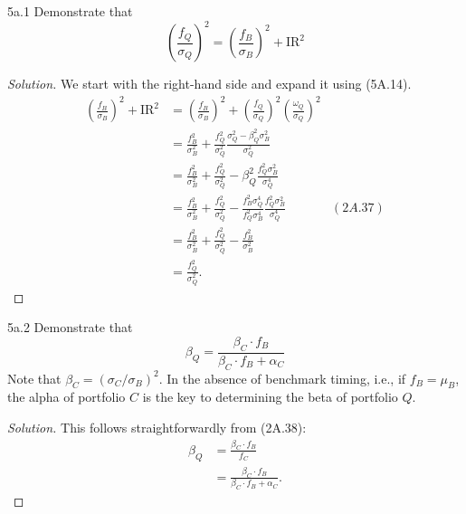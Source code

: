 
\begin{problem}{5a.1}
Demonstrate that \[\left( \frac{f_{Q}}{\sigma_{Q}} \right)^{2} = \left( \frac{f_{B}}{\sigma_{B}} \right)^{2} + \mathrm{IR}^{2}\]
\end{problem}

\begin{proof}[Solution]
We start with the right-hand side and expand it using (5A.14).
\begin{align*}
\left( \frac{f_{B}}{\sigma_{B}} \right)^{2} + \mathrm{IR}^{2} &= \left( \frac{f_{B}}{\sigma_{B}} \right)^{2} + \left( \frac{f_{Q}}{\sigma_{Q}} \right)^{2} \left( \frac{\omega_{Q}}{\sigma_{Q}} \right)^{2}\\
&= \frac{f_{B}^{2}}{\sigma_{B}^{2}} + \frac{f_{Q}^{2}}{\sigma_{Q}^{2}}\frac{\sigma_{Q}^{2} - \beta_{Q}^{2}\sigma_{B}^{2}}{\sigma_{Q}^{2}}\\
&= \frac{f_{B}^{2}}{\sigma_{B}^{2}} + \frac{f_{Q}^{2}}{\sigma_{Q}^{2}} - \beta_{Q}^{2}\frac{f_{Q}^{2}\sigma_{B}^{2}}{\sigma_{Q}^{4}}\\
&= \frac{f_{B}^{2}}{\sigma_{B}^{2}} + \frac{f_{Q}^{2}}{\sigma_{Q}^{2}} - \frac{f_{B}^{2}\sigma_{Q}^{4}}{f_{Q}^{2}\sigma_{B}^{4}}\frac{f_{Q}^{2}\sigma_{B}^{2}}{\sigma_{Q}^{4}} &(2A.37)\\
&= \frac{f_{B}^{2}}{\sigma_{B}^{2}} + \frac{f_{Q}^{2}}{\sigma_{Q}^{2}} - \frac{f_{B}^{2}}{\sigma_{B}^{2}}\\
&= \frac{f_{Q}^{2}}{\sigma_{Q}^{2}}.
\end{align*}
\end{proof}


\begin{problem}{5a.2}
Demonstrate that \[\beta_{Q} = \frac{\beta_{C} \cdot f_{B}}{\beta_{C} \cdot f_{B} + \alpha_{C}}\] Note that $\beta_{C} = (\sigma_{C}/\sigma_{B})^{2}$. In the absence of benchmark timing, i.e., if $f_{B} = \mu_{B}$, the alpha of portfolio $C$ is the key to determining the beta of portfolio $Q$.
\end{problem}

\begin{proof}[Solution]
This follows straightforwardly from (2A.38):
\begin{align*}
\beta_{Q} &= \frac{\beta_{C} \cdot f_{B}}{f_{C}}\\
&= \frac{\beta_{C} \cdot f_{B}}{\beta_{C} \cdot f_{B} + \alpha_{C}}.
\end{align*}
\end{proof}